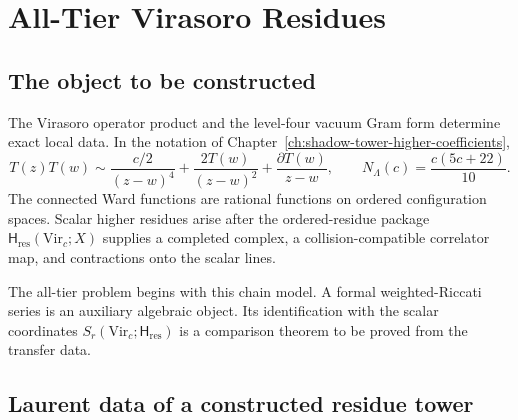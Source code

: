 %

\providecommand{\Vir}{\mathrm{Vir}}
\providecommand{\cA}{\mathcal A}
\providecommand{\ClaimStatusDefinitional}{}
\providecommand{\ClaimStatusConditional}{}
\providecommand{\ClaimStatusOpen}{}

\chapter{All-Tier Virasoro Residues}
\label{ch:all-tier-generating-function}

\section*{The object to be constructed}

The Virasoro operator product and the level-four vacuum Gram form
determine exact local data.  In the notation of
Chapter~\ref{ch:shadow-tower-higher-coefficients},
\[
 T(z)T(w)\sim \frac{c/2}{(z-w)^4}
 +\frac{2T(w)}{(z-w)^2}+\frac{\partial T(w)}{z-w},
 \qquad
 N_\Lambda(c)=\frac{c(5c+22)}{10}.
\]
The connected Ward functions are rational functions on ordered
configuration spaces.  Scalar higher residues arise after the
ordered-residue package
\(\mathsf H_{\mathrm{res}}(\Vir_c;X)\) supplies a completed complex,
a collision-compatible correlator map, and contractions onto the
scalar lines.

The all-tier problem begins with this chain model.  A formal
weighted-Riccati series is an auxiliary algebraic object.  Its
identification with the scalar coordinates
\(S_r(\Vir_c;\mathsf H_{\mathrm{res}})\) is a comparison theorem to be
proved from the transfer data.

\section{Laurent data of a constructed residue tower}

